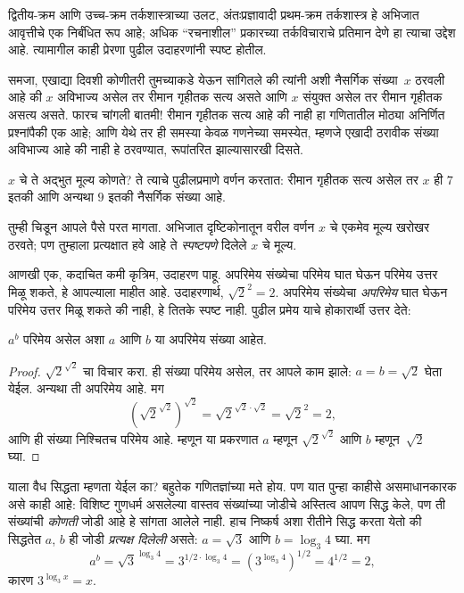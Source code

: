 द्वितीय-क्रम आणि उच्च-क्रम तर्कशास्त्राच्या उलट, अंतःप्रज्ञावादी प्रथम-क्रम
तर्कशास्त्र हे अभिजात आवृत्तीचे एक निर्बंधित रूप आहे; अधिक “रचनाशील” प्रकारच्या
तर्कविचाराचे प्रतिमान देणे हा त्याचा उद्देश आहे. त्यामागील काही प्रेरणा पुढील
उदाहरणांनी स्पष्ट होतील.

समजा, एखाद्या दिवशी कोणीतरी तुमच्याकडे येऊन सांगितले की त्यांनी अशी नैसर्गिक
संख्या~$x$ ठरवली आहे की $x$ अविभाज्य असेल तर रीमान गृहीतक सत्य असते आणि $x$
संयुक्त असेल तर रीमान गृहीतक असत्य असते. फारच चांगली बातमी!{} रीमान गृहीतक
सत्य आहे की नाही हा गणितातील मोठ्या अनिर्णित प्रश्नांपैकी एक आहे; आणि येथे तर
ही समस्या केवळ गणनेच्या समस्येत, म्हणजे एखादी ठरावीक संख्या अविभाज्य आहे की
नाही हे ठरवण्यात, रूपांतरित झाल्यासारखी दिसते.

$x$ चे ते अद्भुत मूल्य कोणते? ते त्याचे पुढीलप्रमाणे वर्णन करतात: रीमान गृहीतक
सत्य असेल तर $x$ ही $7$ इतकी आणि अन्यथा $9$ इतकी नैसर्गिक संख्या आहे.

तुम्ही चिडून आपले पैसे परत मागता. अभिजात दृष्टिकोनातून वरील वर्णन $x$ चे
एकमेव मूल्य खरोखर ठरवते; पण तुम्हाला प्रत्यक्षात हवे आहे ते
\emph{स्पष्टपणे} दिलेले $x$ चे मूल्य.

आणखी एक, कदाचित कमी कृत्रिम, उदाहरण पाहू. अपरिमेय संख्येचा परिमेय घात घेऊन
परिमेय उत्तर मिळू शकते, हे आपल्याला माहीत आहे. उदाहरणार्थ,
$\sqrt{2}^2 = 2$. अपरिमेय संख्येचा \emph{अपरिमेय} घात घेऊन परिमेय उत्तर
मिळू शकते की नाही, हे तितके स्पष्ट नाही. पुढील प्रमेय याचे होकारार्थी उत्तर
देते:

\begin{thm}
$a^b$ परिमेय असेल अशा $a$ आणि $b$ या अपरिमेय संख्या आहेत.
\end{thm}

\begin{proof}
$\sqrt{2}^{\sqrt{2}}$ चा विचार करा. ही संख्या परिमेय असेल, तर आपले काम झाले:
$a = b = \sqrt{2}$ घेता येईल. अन्यथा ती अपरिमेय आहे. मग
\[(\sqrt{2}^{\sqrt{2}})^{\sqrt{2}} = \sqrt{2}^{\sqrt{2} \cdot
  \sqrt{2}} = \sqrt{2}^2 = 2,
\]
आणि ही संख्या निश्चितच परिमेय आहे. म्हणून या प्रकरणात $a$ म्हणून
$\sqrt{2}^{\sqrt{2}}$ आणि $b$ म्हणून~$\sqrt 2$ घ्या.
\end{proof}

याला वैध सिद्धता म्हणता येईल का? बहुतेक गणितज्ञांच्या मते होय. पण यात पुन्हा
काहीसे असमाधानकारक असे काही आहे: विशिष्ट गुणधर्म असलेल्या वास्तव संख्यांच्या
जोडीचे अस्तित्व आपण सिद्ध केले, पण ती संख्यांची \emph{कोणती} जोडी आहे हे
सांगता आलेले नाही. हाच निष्कर्ष अशा रीतीने सिद्ध करता येतो की सिद्धतेत
$a$, $b$ ही जोडी \emph{प्रत्यक्ष दिलेली} असते: $a = \sqrt{3}$ आणि
$b = \log_3 4$ घ्या. मग
\[a^b = \sqrt{3}^{\log_3 4} = 3^{1/2 \cdot \log_3 4} = (3^{\log_3
  4})^{1/2} = 4^{1/2}= 2,
\]
कारण $3^{\log_3 x} = x$.

